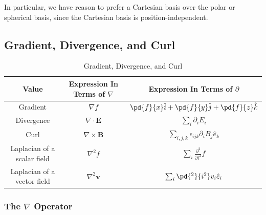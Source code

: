 \documentclass[10pt]{mypackage}
\begin{document}
In particular, we have reason to prefer a Cartesian basis over the polar or spherical basis, since the Cartesian basis is position-independent.
\subsection{Gradient, Divergence, and Curl}%
\begin{table}
  \centering
  \renewcommand{\arraystretch}{1.5}
  \begin{tabular}{c|c|c}
    Value & Expression In Terms of $\nabla$ & Expression In Terms of $\partial$\\
    \hline\hline
    Gradient & $\nabla f$ & $\pd{f}{x} \hat{i} + \pd{f}{y}\hat{j} + \pd{f}{z}\hat{k}$\\
    Divergence & $\nabla \cdot \mathbf{E}$ & $\sum_{i}\partial_i E_i$\\
    Curl & $\nabla \times \mathbf{B}$ & $\sum_{i,j,k}\epsilon_{ijk}\partial_{i}B_j\hat{e}_k$\\
    Laplacian of a scalar field & $\nabla^2 f$ & $\sum_{i}\frac{\partial^2}{\partial i^2}f$\\
    Laplacian of a vector field & $\nabla^2\mathbf{v}$ & $\sum_{i}\pd{^2}{i^2}v_i \hat{e}_i$
  \end{tabular}
  \caption{Gradient, Divergence, and Curl}
\end{table}
\subsubsection{The $\nabla$ Operator}%
\end{document}
